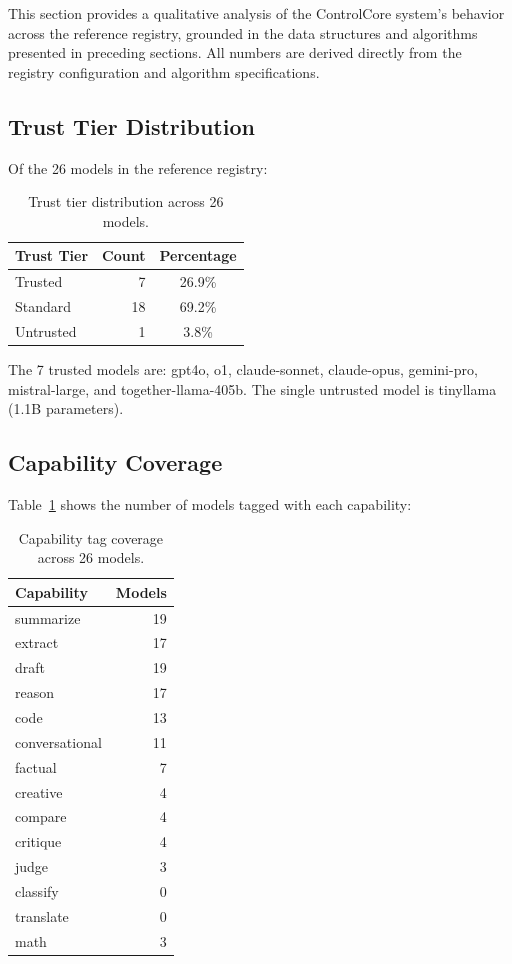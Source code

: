 \documentclass[11pt,a4paper]{article}
\theoremstyle{plain}
\theoremstyle{definition}
\begin{document}
This section provides a qualitative analysis of the ControlCore system's
behavior across the reference registry, grounded in the data structures and
algorithms presented in preceding sections. All numbers are derived directly
from the registry configuration and algorithm specifications.

\subsection{Trust Tier Distribution}

Of the 26 models in the reference registry:

\begin{table}[H]
\centering
\caption{Trust tier distribution across 26 models.}
\begin{tabular}{lrc}
\toprule
\textbf{Trust Tier} & \textbf{Count} & \textbf{Percentage} \\
\midrule
Trusted    & 7  & 26.9\% \\
Standard   & 18 & 69.2\% \\
Untrusted  & 1  & 3.8\%  \\
\bottomrule
\end{tabular}
\end{table}

The 7 trusted models are: gpt4o, o1, claude-sonnet, claude-opus, gemini-pro,
mistral-large, and together-llama-405b. The single untrusted model is
tinyllama (1.1B parameters).

\subsection{Capability Coverage}

Table~\ref{tab:capability} shows the number of models tagged with each
capability:

\begin{table}[H]
\centering
\caption{Capability tag coverage across 26 models.}
\label{tab:capability}
\begin{tabular}{lr}
\toprule
\textbf{Capability} & \textbf{Models} \\
\midrule
summarize       & 19 \\
extract         & 17 \\
draft           & 19 \\
reason          & 17 \\
code            & 13 \\
conversational  & 11 \\
factual         & 7  \\
creative        & 4  \\
compare         & 4  \\
critique        & 4  \\
judge           & 3  \\
classify        & 0  \\
translate       & 0  \\
math            & 3  \\
\bottomrule
\end{tabular}
\end{table}
\end{document}
